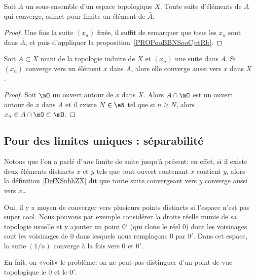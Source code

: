 \begin{corollary}\label{CorLimAbarA}
  Soit \( A \) un sous-ensemble d'un espace topologique \(X \). Toute suite d'éléments de \(A \) qui converge, admet pour limite un élément de \( \bar A \).
\end{corollary}
\begin{proof}
  Une fois la suite \( (x_n) \) fixée, il suffit de remarquer que tous les \( x_n \) sont dans \( \bar A \), et puis d'appliquer la proposition~\ref{PROPooBBNSooCjrtRb}. 
\end{proof}


\begin{lemma}   \label{LemPESaiVw}
    Soit \( A\subset X\) muni de la topologie induite de \( X\) et \( (x_n)\) une suite dans \( A\). Si \( (x_n) \) converge vers un élément \( x \) dans \(A \), alors elle converge aussi vers \(x \) dans \( X \).
\end{lemma}

\begin{proof}
    Soit \( \mO\) un ouvert autour de \( x\) dans \( X\). Alors \( A\cap\mO\) est un ouvert autour de \( x\) dans \( A\) et il existe \( N\in \eN\) tel que si \( n\geq N\), alors \( x_n\in A\cap\mO\subset\mO\).
\end{proof}

\subsection{Pour des limites uniques : séparabilité}

Notons que l'on a parlé d'\emph{une} limite de suite jusqu'à présent: en effet, si il existe deux éléments distincts $x$ et $y$ tels que tout ouvert contenant $x$ contient $y$, alors la définition \ref{DefXSnbhZX} dit que toute suite convergeant vers $y$ converge aussi vers $x$\dots


\begin{example} \label{EXooSHKAooZQEVLB}
    Oui, il y a moyen de converger vers plusieurs points distincts si l'espace n'est pas super cool. Nous pouvons par exemple \cite{EJVQuas} considérer la droite réelle munie de sa topologie usuelle et y ajouter un point $0'$ (qui clone le réel $0$) dont les voisinages sont les voisinages de $0$ dans lesquels nous remplaçons $0$ par $0'$. Dans cet espace, la suite $(1/n)$ converge à la fois vers $0$ et $0'$.

    En fait, on «voit» le problème: on ne peut pas distinguer d'un point de vue topologique le $0$ et le $0'$.
\end{example}

